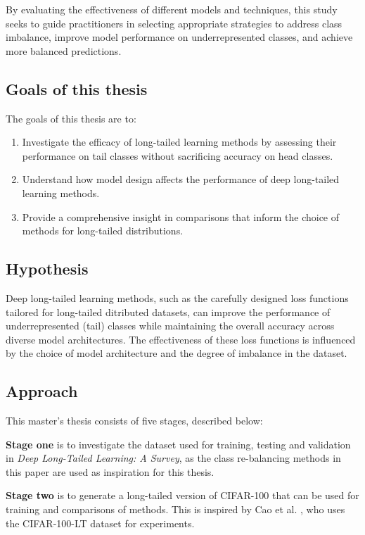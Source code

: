 By evaluating the effectiveness of different models and techniques, this study seeks to guide practitioners in selecting appropriate strategies to address class imbalance, improve model performance on underrepresented classes, and achieve more balanced predictions.


\subsection{Goals of this thesis}
\label{sec:goals}
The goals of this thesis are to:

\begin{enumerate}
    \item Investigate the efficacy of long-tailed learning methods by assessing their performance on tail classes without sacrificing accuracy on head classes. 
    \item Understand how model design affects the performance of deep long-tailed learning methods.
    \item Provide a comprehensive insight in comparisons that inform the choice of methods for long-tailed distributions.
\end{enumerate}

\subsection{Hypothesis}
Deep long-tailed learning methods, such as the carefully designed loss functions tailored for long-tailed ditributed datasets, can improve the performance of underrepresented (tail) classes while maintaining the overall accuracy across diverse model architectures. The effectiveness of these loss functions is influenced by the choice of model architecture and the degree of imbalance in the dataset.


\subsection{Approach}
This master's thesis consists of five stages, described below:  
\vspace{1em}

\noindent \textbf{Stage one} is to investigate the dataset used for training, testing and validation in \textit{Deep Long-Tailed Learning: A Survey}, as the class re-balancing methods in this paper are used as inspiration for this thesis.
\vspace{1em}

\noindent \textbf{Stage two} is to generate a long-tailed version of CIFAR-100 that can be used for training and comparisons of methods. This is inspired by Cao et al. \cite{cao2019learningimbalanceddatasetslabeldistributionaware}, who uses the CIFAR-100-LT dataset for experiments.
\vspace{1em}

